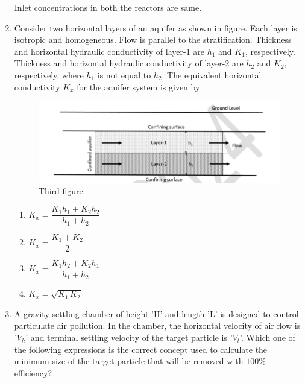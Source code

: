 \documentclass[journal]{IEEEtran}
\numberwithin{equation}{enumi}
\numberwithin{figure}{enumi}
\begin{document}
\begin{enumerate}[start=1, label={Q\arabic*.}]
Inlet concentrations in both the reactors are same.
 \begin{enumerate} 
  \end{enumerate}
\item Consider two horizontal layers of an aquifer as shown in figure. Each layer is isotropic
and homogeneous. Flow is parallel to the stratification. Thickness and horizontal
hydraulic conductivity of layer-1 are $h_1$ and $K_1$, respectively. Thickness and horizontal
hydraulic conductivity of layer-2 are $h_2$ and $K_2$, respectively, where $h_1$ is not equal to $h_2$.
The equivalent horizontal conductivity $K_x$ for the aquifer system is given by \underline{\hspace{1.5cm}}
\begin{figure}[H]
    \centering
    \includegraphics[width=0.6\linewidth]{figs/fig3.png}
    \caption{Third figure}
    \label{fig:third}
\end{figure}
\newpage
\begin{enumerate} 
    \item $K_x = \dfrac{K_1 h_1 + K_2 h_2}{h_1 + h_2}$
    \item $K_x = \dfrac{K_1 + K_2}{2}$
    \item $K_x = \dfrac{K_1 h_2 + K_2 h_1}{h_1 + h_2}$
    \item $K_x = \sqrt{K_1 \, K_2}$
\end{enumerate}

\item A gravity settling chamber of height 'H' and length 'L' is designed to control particulate
air pollution. In the chamber, the horizontal velocity of air flow is '$V_h$' and terminal
settling velocity of the target particle is '$V_t$'.
Which one of the following expressions is the correct concept used to calculate the
minimum size of the target particle that will be removed with $100\%$ efficiency?
 \begin{enumerate} 
  \end{enumerate}
  

\end{enumerate}
\end{document}
